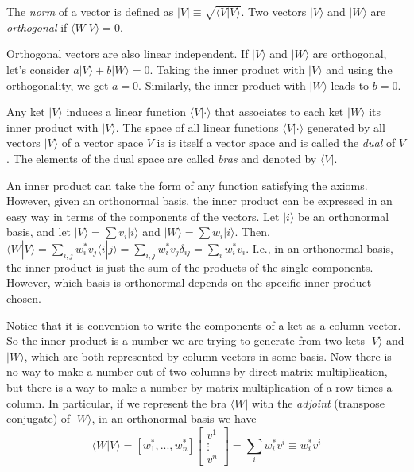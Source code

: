 \documentclass[11pt,fleqn]{book} %
\newcommand{\bra}[1]{\langle #1|}
\newcommand{\ket}[1]{| #1\rangle}
\newcommand{\scalar}[2]{\langle #1| #2\rangle}
\begin{document}
\begin{definition}
    The \textit{norm} of a vector is defined as $|V|\equiv\sqrt{\scalar{V}{V}}$. 
    Two vectors $\ket{V}$ and $\ket{W}$ are \textit{orthogonal} if $\scalar{W}{V}=0$.
\end{definition}

\begin{remark}
    Orthogonal vectors are also linear independent. If $\ket{V}$ and $\ket{W}$ are orthogonal, let's consider
    $a\ket{V}+b\ket{W}=0$. Taking the inner product with $\ket{V}$ and using the orthogonality, we get $a=0$. Similarly, the
    inner product with $\ket{W}$ leads to $b=0$.
\end{remark}

\begin{definition}
    Any ket $\ket{V}$ induces a linear function $\scalar{V}{\cdot}$ that associates to each ket $\ket{W}$ its inner product with 
    $\ket{V}$. The space of all linear functions $\scalar{V}{\cdot}$ generated by all vectors $\ket{V}$ of a vector space $V$ is
    is itself a vector space and is called the \textit{dual} of $V$. 
    The elements of the dual space are called \textit{bras} and denoted by $\bra{V}$.
\end{definition}

An inner product can take the form of any function satisfying the axioms. However, given an orthonormal basis, the inner product can be
expressed in an easy way in terms of the components of the vectors. Let $\ket{i}$ be an orthonormal basis, and let 
$\ket{V}=\sum v_i\ket{i}$ and $\ket{W}=\sum w_i\ket{i}$. Then, 
$\scalar{W}{V}=\sum_{i,j}w^*_iv_j\scalar{i}{j}=\sum_{i,j}w^*_iv_j\delta_{ij}=\sum_i w^*_iv_i$.
I.e., in an orthonormal basis, the inner product is just the sum of the products of the single components. However, which basis is 
orthonormal depends on the specific inner product chosen.

Notice that it is convention to write the components of a ket as a column vector.
So the inner product is a number we are trying to generate from two kets $\ket{V}$ and $\ket{W}$, which are both represented by column vectors
in some basis. Now there is no way to make a number out of two columns by direct matrix multiplication, but there is a way to make a number 
by matrix multiplication of a row times a column. In particular, if we represent the bra $\bra{W}$ with the \textit{adjoint} (transpose
conjugate) of $\ket{W}$, in an orthonormal basis we have 
\begin{equation}
    \label{eq:bra_components}
    \scalar{W}{V}=[w^*_1,...,w^*_n]
    \left[\begin{array}{c}
        v^1\\
        \vdots\\
        v^n
    \end{array}\right]=
    \sum_i w^*_iv^i\equiv w^*_iv^i
\end{equation}
\end{document}
